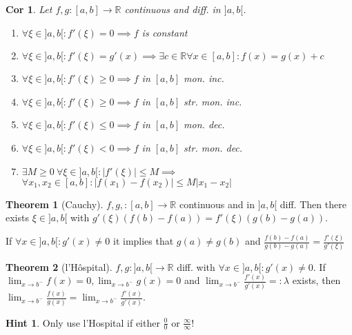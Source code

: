 \documentclass[a4paper, 10pt]{article}
\newtheorem*{corollary}{Cor}
\theoremstyle{definition}
\newtheorem*{note_wrapper}{Hint}
\theoremstyle{named}
\newtheorem*{ntheorem_wrapper}{Theorem}
\newenvironment{ntheorem}%
    {\begin{mdframed}[style=important]\begin{ntheorem_wrapper}}%
    {\end{ntheorem_wrapper}\end{mdframed}}
\newenvironment{note}%
    {\begin{mdframed}[style=trick]\begin{note_wrapper}}%
    {\end{note_wrapper}\end{mdframed}}
\newcommand{\R}{\mathbb{R}}
\begin{document}
\begin{corollary}
    Let $f, g: [a, b] \to \R$ continuous and diff. in $]a, b[$.
    \begin{enumerate}
        \item $\forall \xi \in ]a, b[: f'(\xi) = 0 \implies f$ is constant
        \item $\forall \xi \in ]a, b[: f'(\xi) = g'(x) \implies \exists c \in \R \forall x \in [a, b] : f(x) = g(x) + c$
        \item $\forall \xi \in ]a, b[: f'(\xi) \geq 0 \implies f$ in $[a, b]$ mon. inc.
        \item $\forall \xi \in ]a, b[: f'(\xi) \geq 0 \implies f$ in $[a, b]$ str. mon. inc.
        \item $\forall \xi \in ]a, b[: f'(\xi) \leq 0 \implies f$ in $[a, b]$ mon. dec.
        \item $\forall \xi \in ]a, b[: f'(\xi) < 0 \implies f$ in $[a, b]$ str. mon. dec.
        \item $\exists M \geq 0 \ \forall \xi \in ]a, b[ : |f'(\xi)| \leq M \implies$ \newline $\forall x_1, x_2 \in [a, b]: |f(x_1) - f(x_2)| \leq M |x_1 - x_2|$
    \end{enumerate}
\end{corollary}

\begin{ntheorem}[Cauchy]
    $f, g,: [a, b] \to \R$ continuous and in $]a, b[$ diff. Then there exists $\xi \in ]a, b[$ with $g'(\xi)(f(b) - f(a)) = f'(\xi)(g(b) - g(a))$.

    If $\forall x \in ]a, b[ : g'(x) \neq 0$ it implies that $g(a) \neq g(b)$ and $\frac{f(b) - f(a)}{g(b) - g(a)} = \frac{f'(\xi)}{g'(\xi)}$
\end{ntheorem}

\begin{ntheorem}[l'Hôspital]
    $f,g : ]a, b[ \to \R$ diff. with $\forall x \in ]a, b[ : g'(x) \neq 0$.
    If $\lim_{x \to b^-} f(x) = 0, \lim_{x \to b^-} g(x) = 0$ and $\lim_{x \to b^-} \frac{f'(x)}{g'(x)} =: \lambda$ exists, then $\lim_{x \to b^-}\frac{f(x)}{g(x)} = \lim_{x \to b^-}\frac{f'(x)}{g'(x)}$.
\end{ntheorem}

\begin{note}
    Only use l'Hospital if either $\frac{0}{0}$ or $\frac{\infty}{\infty}$!
\end{note}
\end{document}
